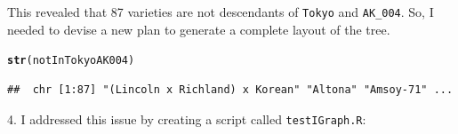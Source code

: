 \documentclass{article}\usepackage[]{graphicx}\usepackage[]{color}
\makeatletter
\newcommand{\hlstd}[1]{\textcolor[rgb]{0.345,0.345,0.345}{#1}}%
\newcommand{\hlkwd}[1]{\textcolor[rgb]{0.737,0.353,0.396}{\textbf{#1}}}%
\newenvironment{kframe}{%
 \def\at@end@of@kframe{}%
 \ifinner\ifhmode%
  \def\at@end@of@kframe{\end{minipage}}%
  \begin{minipage}{\columnwidth}%
 \fi\fi%
 \def\FrameCommand##1{\hskip\@totalleftmargin \hskip-\fboxsep
 \colorbox{shadecolor}{##1}\hskip-\fboxsep
     \hskip-\linewidth \hskip-\@totalleftmargin \hskip\columnwidth}%
 \MakeFramed {\advance\hsize-\width
   \@totalleftmargin\z@ \linewidth\hsize
   \@setminipage}}%
 {\par\unskip\endMakeFramed%
 \at@end@of@kframe}
\newenvironment{knitrout}{}{} %
\makeatother
\begin{document}
This revealed that 87 varieties are not descendants of {\tt Tokyo} and {\tt AK\_004}. So, I needed to devise a new plan to generate a complete layout of the tree.

\begin{knitrout}
\color{fgcolor}\begin{kframe}
\begin{alltt}
\hlkwd{str}\hlstd{(notInTokyoAK004)}
\end{alltt}
\begin{verbatim}
##  chr [1:87] "(Lincoln x Richland) x Korean" "Altona" "Amsoy-71" ...
\end{verbatim}
\end{kframe}
\end{knitrout}


4. I addressed this issue by creating a script called {\tt testIGraph.R}:
\end{document}
